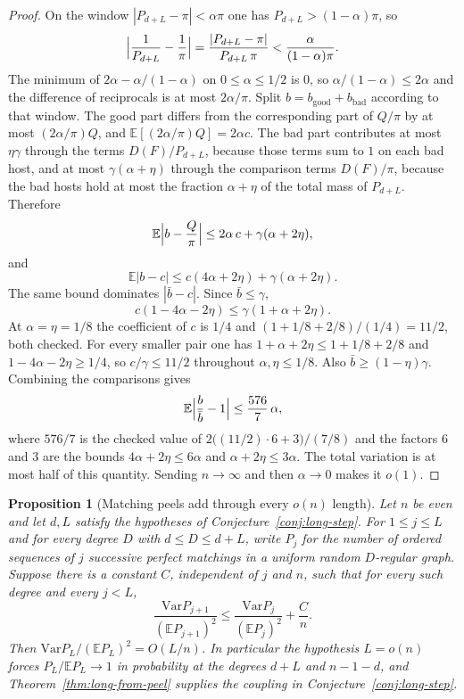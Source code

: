 \documentclass[11pt]{article}
\newtheorem{proposition}[theorem]{Proposition}
\newcommand{\EE}{\mathbb{E}}
\newcommand{\Var}{\mathrm{Var}}
\begin{document}
\begin{proof}
On the window \(|P_{d+L}-\pi|<\alpha\pi\) one has \(P_{d+L}>(1-\alpha)\pi\), so
\[
\Bigl|\frac1{P_{d+L}}-\frac1\pi\Bigr|
=
\frac{|P_{d+L}-\pi|}{P_{d+L}\,\pi}
<
\frac{\alpha}{(1-\alpha)\pi}.
\]
The minimum of \(2\alpha-\alpha/(1-\alpha)\) on \(0\le\alpha\le 1/2\) is \(0\),
so \(\alpha/(1-\alpha)\le 2\alpha\) and the difference of reciprocals is at most
\(2\alpha/\pi\).
Split \(b=b_{\mathrm{good}}+b_{\mathrm{bad}}\) according to that window.
The good part differs from the corresponding part of \(Q/\pi\) by at most
\((2\alpha/\pi)Q\), and \(\EE[(2\alpha/\pi)Q]=2\alpha c\).
The bad part contributes at most \(\eta\gamma\) through the terms \(D(F)/P_{d+L}\),
because those terms sum to \(1\) on each bad host, and at most
\(\gamma(\alpha+\eta)\) through the comparison terms \(D(F)/\pi\), because the
bad hosts hold at most the fraction \(\alpha+\eta\) of the total mass of
\(P_{d+L}\).
Therefore
\[
\EE\Bigl|b-\frac{Q}{\pi}\Bigr|
\le
2\alpha\, c+\gamma(\alpha+2\eta),
\]
and
\[
\EE|b-c|
\le
c(4\alpha+2\eta)+\gamma(\alpha+2\eta).
\]
The same bound dominates \(|\bar b-c|\).
Since \(\bar b\le\gamma\),
\[
c(1-4\alpha-2\eta)
\le
\gamma(1+\alpha+2\eta).
\]
At \(\alpha=\eta=1/8\) the coefficient of \(c\) is \(1/4\) and
\((1+1/8+2/8)/(1/4)=11/2\), both checked.
For every smaller pair one has \(1+\alpha+2\eta\le 1+1/8+2/8\) and
\(1-4\alpha-2\eta\ge 1/4\), so \(c/\gamma\le 11/2\) throughout
\(\alpha,\eta\le 1/8\).
Also \(\bar b\ge(1-\eta)\gamma\). Combining the comparisons gives
\[
\EE\Bigl|\frac{b}{\bar b}-1\Bigr|
\le
\frac{576}{7}\,\alpha,
\]
where \(576/7\) is the checked value of
\(2\bigl((11/2)\cdot 6+3\bigr)/(7/8)\) and the factors \(6\) and \(3\) are the
bounds \(4\alpha+2\eta\le 6\alpha\) and \(\alpha+2\eta\le 3\alpha\).
The total variation is at most half of this quantity.
Sending \(n\to\infty\) and then \(\alpha\to 0\) makes it \(o(1)\).
\end{proof}

\begin{proposition}[Matching peels add through every \(o(n)\) length]
\label{prop:peel-budget}
Let \(n\) be even and let \(d,L\) satisfy the hypotheses of
Conjecture~\ref{conj:long-step}.
For \(1\le j\le L\) and for every degree \(D\) with
\(d\le D\le d+L\), write \(P_j\) for the number of ordered sequences of \(j\)
successive perfect matchings in a uniform random \(D\)-regular graph.
Suppose there is a constant \(C\), independent of \(j\) and \(n\), such that
for every such degree and every \(j<L\),
\[
\frac{\Var P_{j+1}}{(\EE P_{j+1})^2}
\le
\frac{\Var P_j}{(\EE P_j)^2}
+
\frac{C}{n}.
\]
Then \(\Var P_L/(\EE P_L)^2=O(L/n)\).
In particular the hypothesis \(L=o(n)\) forces \(P_L/\EE P_L\to 1\) in
probability at the degrees \(d+L\) and \(n-1-d\), and
Theorem~\ref{thm:long-from-peel} supplies the coupling in
Conjecture~\ref{conj:long-step}.
\end{proposition}
\end{document}
